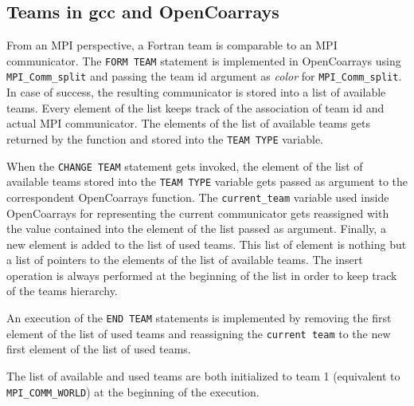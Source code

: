 \subsection{Teams in \gls{gcc} and OpenCoarrays}\label{subsec:teams-in-gcc}

From an MPI perspective, a Fortran team is comparable to an MPI communicator. The \texttt{FORM TEAM} statement is implemented in OpenCoarrays
using \texttt{MPI\_Comm\_split} and passing the team id argument as \textit{color} for \texttt{MPI\_Comm\_split}.
In case of success, the resulting communicator is stored into a list of available teams.
Every element of the list keeps track of the association of team id and actual MPI communicator.
The elements of the list of available teams gets returned by the function and stored into the \texttt{TEAM TYPE} variable.

When the \texttt{CHANGE TEAM} statement gets invoked, the element of the list of available teams stored into the \texttt{TEAM TYPE} variable
gets passed as argument to the correspondent OpenCoarrays function. The \texttt{current\_team} variable used inside OpenCoarrays for
representing the current communicator gets reassigned with the value contained into the element of the list passed as argument.
Finally, a new element is added to the list of used teams. This list of element is nothing but a list of pointers to the elements of the list
of available teams. The insert operation is always performed at the beginning of the list in order to keep track of the teams hierarchy.

An execution of the \texttt{END TEAM} statements is implemented by removing the first element of the list of used teams and reassigning the
\texttt{current team} to the new first element of the list of used teams.

The list of available and used teams are both initialized to team 1 (equivalent to \texttt{MPI\_COMM\_WORLD}) at the beginning of the execution.


